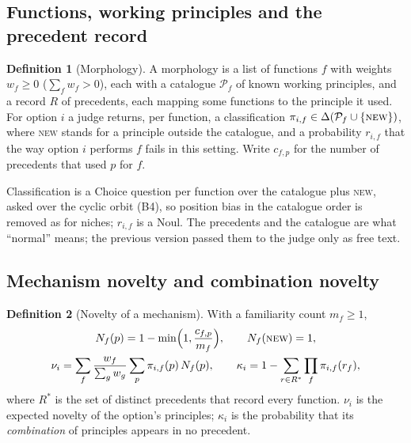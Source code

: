 \documentclass[11pt]{article}
\theoremstyle{definition}
\newtheorem{definition}{Definition}
\begin{document}
\subsection{Functions, working principles and the precedent record}

\begin{definition}[Morphology]\label{def:morph}
A morphology is a list of functions $f$ with weights $w_f\ge0$ ($\sum_f w_f>0$), each with a
catalogue $\mathcal P_f$ of known working principles, and a record $R$ of precedents, each mapping
some functions to the principle it used. For option $i$ a judge returns, per function, a
classification $\pi_{i,f}\in\Delta(\mathcal P_f\cup\{\textsc{new}\})$, where \textsc{new} stands for
a principle outside the catalogue, and a probability $r_{i,f}$ that the way option $i$ performs $f$
fails in this setting. Write $c_{f,p}$ for the number of precedents that used $p$ for $f$.
\end{definition}

Classification is a Choice question per function over the catalogue plus \textsc{new}, asked over
the cyclic orbit (B4), so position bias in the catalogue order is removed as for niches; $r_{i,f}$
is a Noul. The precedents and the catalogue are what ``normal'' means; the previous version passed
them to the judge only as free text.

\subsection{Mechanism novelty and combination novelty}

\begin{definition}[Novelty of a mechanism]\label{def:nov}
With a familiarity count $m_f\ge1$,
\begin{gather*}
N_f(p)=1-\min\Bigl(1,\frac{c_{f,p}}{m_f}\Bigr),\qquad N_f(\textsc{new})=1,\\
\nu_i=\sum_f\frac{w_f}{\sum_g w_g}\sum_p\pi_{i,f}(p)\,N_f(p),\qquad
\kappa_i=1-\sum_{r\in R^\ast}\prod_f\pi_{i,f}(r_f),
\end{gather*}
where $R^\ast$ is the set of distinct precedents that record every function. $\nu_i$ is the
expected novelty of the option's principles; $\kappa_i$ is the probability that its
\emph{combination} of principles appears in no precedent.
\end{definition}
\end{document}
